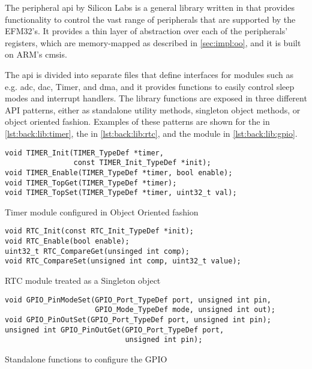 The {\emlib} peripheral \gls{api} by Silicon Labs is a general library written in {\C} that provides functionality to control the vast range of peripherals that are supported by the EFM32's.
It provides a thin layer of abstraction over each of the peripherals' registers, which are memory-mapped as described in \autoref{sec:impl:oo}, and it is built on ARM's \gls{cmsis}.

The \gls{api} is divided into separate files that define interfaces for modules such as e.g. \gls{adc}, \gls{dac}, Timer, and \gls{dma}, and it provides functions to easily control sleep modes and interrupt handlers.
The library functions are exposed in three different API patterns, either as standalone utility methods, singleton object methods, or {\C} object oriented fashion.
Examples of these patterns are shown for the  in \autoref{lst:back:lib:timer}, the  in \autoref{lst:back:lib:rtc}, and the  module in \autoref{lst:back:lib:gpio}.

\begin{listing}[H]
  \begin{verbatim}
void TIMER_Init(TIMER_TypeDef *timer,
                const TIMER_Init_TypeDef *init);
void TIMER_Enable(TIMER_TypeDef *timer, bool enable);
void TIMER_TopGet(TIMER_TypeDef *timer);
void TIMER_TopSet(TIMER_TypeDef *timer, uint32_t val);
  \end{verbatim}
  \caption{Timer module configured in {\C} Object Oriented fashion}
  \label{lst:back:lib:timer}
\end{listing}

\begin{listing}[H]
  \begin{verbatim}
void RTC_Init(const RTC_Init_TypeDef *init);
void RTC_Enable(bool enable);
uint32_t RTC_CompareGet(unsinged int comp);
void RTC_CompareSet(unsigned int comp, uint32_t value);
  \end{verbatim}
  \caption{RTC module treated as a Singleton object}
  \label{lst:back:lib:rtc}
\end{listing}

\begin{listing}[H]
  \begin{verbatim}
void GPIO_PinModeSet(GPIO_Port_TypeDef port, unsigned int pin,
                     GPIO_Mode_TypeDef mode, unsigned int out);
void GPIO_PinOutSet(GPIO_Port_TypeDef port, unsigned int pin);
unsigned int GPIO_PinOutGet(GPIO_Port_TypeDef port,
                            unsigned int pin);
  \end{verbatim}
  \caption{Standalone functions to configure the GPIO}
  \label{lst:back:lib:gpio}
\end{listing}

